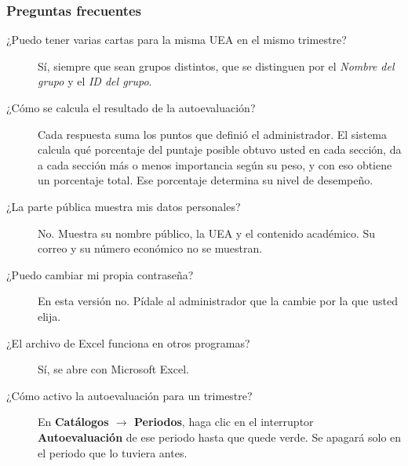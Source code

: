 \subsubsection{Preguntas frecuentes}

\begin{description}
    \item[¿Puedo tener varias cartas para la misma UEA en el mismo trimestre?] Sí, siempre que sean grupos distintos, que se distinguen por el \emph{Nombre del grupo} y el \emph{ID del grupo}.
    \item[¿Cómo se calcula el resultado de la autoevaluación?] Cada respuesta suma los puntos que definió el administrador. El sistema calcula qué porcentaje del puntaje posible obtuvo usted en cada sección, da a cada sección más o menos importancia según su peso, y con eso obtiene un porcentaje total. Ese porcentaje determina su nivel de desempeño.
    \item[¿La parte pública muestra mis datos personales?] No. Muestra su nombre público, la UEA y el contenido académico. Su correo y su número económico no se muestran.
    \item[¿Puedo cambiar mi propia contraseña?] En esta versión no. Pídale al administrador que la cambie por la que usted elija.
    \item[¿El archivo de Excel funciona en otros programas?] Sí, se abre con Microsoft Excel.
    \item[¿Cómo activo la autoevaluación para un trimestre?] En \textbf{Catálogos $\to$ Periodos}, haga clic en el interruptor \textbf{Autoevaluación} de ese periodo hasta que quede verde. Se apagará solo en el periodo que lo tuviera antes.
\end{description}

